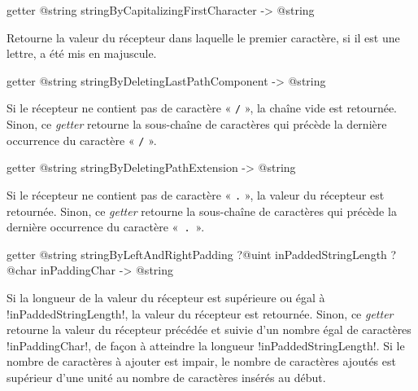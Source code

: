 
\begin{galgas3box}
getter @string stringByCapitalizingFirstCharacter -> @string
\end{galgas3box}

Retourne la valeur du récepteur dans laquelle le premier caractère, si il est une lettre, a été mis en majuscule.









\begin{galgas3box}
getter @string stringByDeletingLastPathComponent -> @string
\end{galgas3box}

Si le récepteur ne contient pas de caractère « \texttt{/} », la chaîne vide est retournée. Sinon, ce \emph{getter} retourne la sous-chaîne de caractères qui précède la dernière occurrence du caractère « \texttt{/} ».










\begin{galgas3box}
getter @string stringByDeletingPathExtension -> @string
\end{galgas3box}

Si le récepteur ne contient pas de caractère « \texttt{.} », la valeur du récepteur est retournée. Sinon, ce \emph{getter} retourne la sous-chaîne de caractères qui précède la dernière occurrence du caractère «~\texttt{.}~».









\begin{galgas3box}
getter @string stringByLeftAndRightPadding
   ?@uint inPaddedStringLength
   ?@char inPaddingChar -> @string
\end{galgas3box}

Si la longueur de la valeur du récepteur est supérieure ou égal à \ggst!inPaddedStringLength!, la valeur du récepteur est retournée. Sinon, ce \emph{getter} retourne la valeur du récepteur précédée et suivie d'un nombre égal de caractères \ggst!inPaddingChar!, de façon à atteindre la longueur \ggst!inPaddedStringLength!. Si le nombre de caractères à ajouter est impair, le nombre de caractères ajoutés est supérieur d'une unité au nombre de caractères insérés au début.








